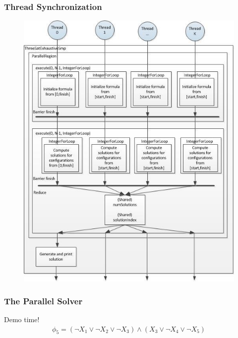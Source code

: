 \documentclass[handout]{beamer}
\begin{document}
\begin{frame}
	\frametitle{Thread Synchronization}
\vspace{-1em}
\begin{figure}
\centering
\includegraphics[scale = 0.29]{design.jpg}
\end{figure}
\end{frame}

\begin{frame}
	\frametitle{The Parallel Solver}
	\begin{center}
		Demo time!
		\begin{align*}
			\phi_5 = (\lnot X_1 \lor \lnot X_2 \lor \lnot X_3) \land (X_3 \lor \lnot X_4 \lor \lnot X_5)
		\end{align*}
	\end{center}
\end{frame}
\end{document}
